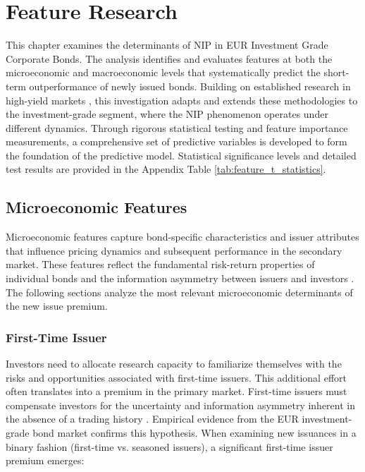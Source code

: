\chapter{Feature Research}
\label{ch:feature_research}

This chapter examines the determinants of NIP in EUR Investment Grade Corporate Bonds. The analysis identifies and evaluates features at both the microeconomic and macroeconomic levels that systematically predict the short-term outperformance of newly issued bonds. Building on established research in high-yield markets \parencite{Geerts2022PredictingYield}, this investigation adapts and extends these methodologies to the investment-grade segment, where the NIP phenomenon operates under different dynamics. Through rigorous statistical testing and feature importance measurements, a comprehensive set of predictive variables is developed to form the foundation of the predictive model. Statistical significance levels and detailed test results are provided in the Appendix Table \ref{tab:feature_t_statistics}.

\section{Microeconomic Features}

Microeconomic features capture bond-specific characteristics and issuer attributes that influence pricing dynamics and subsequent performance in the secondary market. These features reflect the fundamental risk-return properties of individual bonds and the information asymmetry between issuers and investors \parencite{Geerts2022PredictingYield}. The following sections analyze the most relevant microeconomic determinants of the new issue premium.

\subsection{First-Time Issuer}
Investors need to allocate research capacity to familiarize themselves with the risks and opportunities associated with first-time issuers. This additional effort often translates into a premium in the primary market. First-time issuers must compensate investors for the uncertainty and information asymmetry inherent in the absence of a trading history \parencite{Geerts2022PredictingYield}. Empirical evidence from the EUR investment-grade bond market confirms this hypothesis. When examining new issuances in a binary fashion (first-time vs. seasoned issuers), a significant first-time issuer premium emerges:

